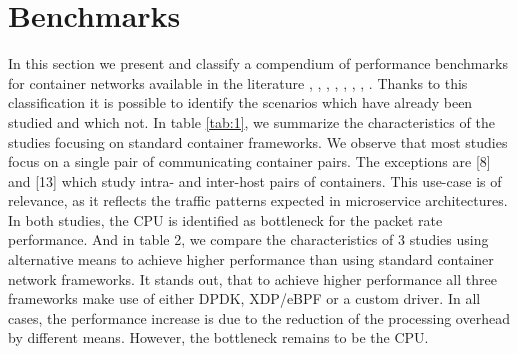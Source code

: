 \documentclass[conference]{IEEEtran}
\begin{document}
\section{Benchmarks}
In this section we present and classify a compendium of performance benchmarks for container networks available in the literature 
\cite{IEEE_INFOCOM_2018:K. Suo}, \cite{HotConNet_17:Zhao}, \cite{Nakamura:2018}, \cite{Boeira:2021}, \cite{Bankston:2018}, \cite{CoNEXT:2018}, \cite{ICTC_2018:Park}, \cite{NOMS_2016:Claassen}. Thanks to this classification it is possible to identify the scenarios which have already been studied and which not. In table \ref{tab:1}, we summarize the characteristics of the studies focusing on standard container frameworks. We observe that most studies focus on a single pair of communicating container pairs. The exceptions are [8] and [13] which study intra- and inter-host pairs of containers. This use-case is of relevance, as it reflects the traffic patterns expected in microservice architectures. In both studies, the CPU is identified as bottleneck for the packet rate performance. And in table 2, we compare the characteristics of 3 studies using alternative means to achieve higher performance than using standard container network frameworks. It stands out, that to achieve higher performance all three frameworks make use of either DPDK, XDP/eBPF or a custom driver.  In all cases, the performance increase is due to the reduction of the processing overhead by different means. However, the bottleneck remains to be the CPU.
\end{document}
